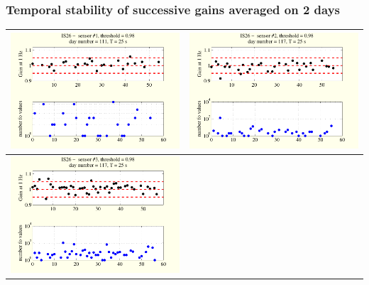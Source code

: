 \documentclass[handout,9pt]{beamer}
\begin{document}
\begin{frame}
\frametitle{Temporal stability of successive gains averaged on 2 days}
\begin{tabular}{c||c}
\includegraphics[scale=0.3]{evolutionon1atfreq1.pdf}
&
\includegraphics[scale=0.3]{evolutionon2atfreq1.pdf}
\\
\hline\hline
\includegraphics[scale=0.3]{evolutionon3atfreq1.pdf}

\end{tabular}
\end{frame}
\end{document}
